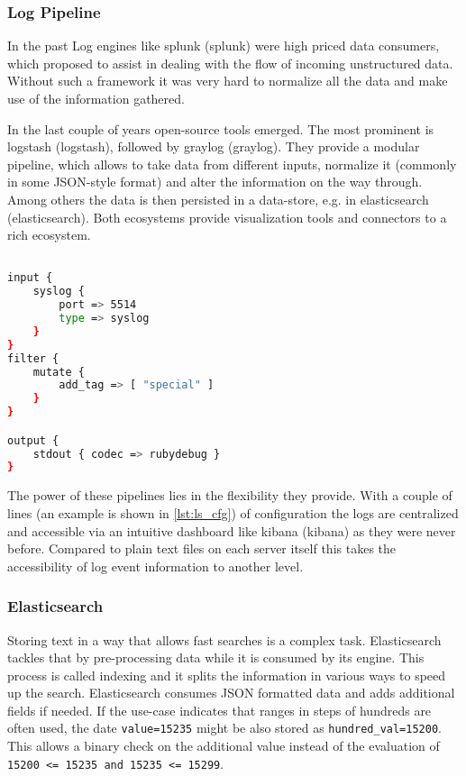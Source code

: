 \subsubsection{Log Pipeline}
In the past Log engines like \gls{splunk} (\glsdesc{splunk}) were high priced data consumers, which proposed to assist in dealing with the
flow of incoming unstructured data. Without such a framework it was very hard to normalize all the data and make use of the information gathered.

In the last couple of years open-source tools emerged. The most prominent is \gls{logstash} (\glsdesc{logstash}),
followed by \gls{graylog} (\glsdesc{graylog}).
They provide a modular pipeline, which allows to take data from different inputs, normalize it (commonly in some JSON-style format)
and alter the information on the way through. Among others the data is then persisted in a data-store, e.g. in \gls{elasticsearch} (\glsdesc{elasticsearch}).
Both ecosystems provide visualization tools and connectors to a rich ecosystem.

\begin{lstlisting}[language=bash,label={lst:ls_cfg},
    caption={Basic Logstash configuration which consumes events via syslog endpoint, adds a tag and writes events to stdout.}]

input {
    syslog {
        port => 5514
        type => syslog
    }
}
filter {
    mutate {
        add_tag => [ "special" ]
    }
}

output {
    stdout { codec => rubydebug }
}
\end{lstlisting}

The power of these pipelines lies in the flexibility they provide. With a couple of lines (an example is shown in \autoref{lst:ls_cfg}) of
configuration the logs are centralized and accessible via an intuitive dashboard like \gls{kibana} (\glsdesc{kibana}) as they were never before. Compared to plain text files on each server itself this takes the accessibility of log event information to another level.

\subsubsection{Elasticsearch}
Storing text in a way that allows fast searches is a complex task. Elasticsearch tackles that by pre-processing data while it is consumed by its engine.
This process is called indexing and it splits the information in various ways to speed up the search.
Elasticsearch consumes JSON formatted data and adds additional fields if needed.
If the use-case indicates that ranges in steps of hundreds are often used, the date \lstinline{value=15235} might be also stored
as \lstinline{hundred_val=15200}. This allows a binary check on the additional value instead of the evaluation of \lstinline{15200 <= 15235 and 15235 <= 15299}.


